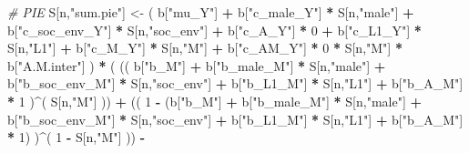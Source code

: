 \documentclass[
]{book}
\newenvironment{Shaded}{\begin{snugshade}}{\end{snugshade}}
\newcommand{\CommentTok}[1]{\textcolor[rgb]{0.56,0.35,0.01}{\textit{#1}}}
\newcommand{\DecValTok}[1]{\textcolor[rgb]{0.00,0.00,0.81}{#1}}
\newcommand{\NormalTok}[1]{#1}
\newcommand{\OtherTok}[1]{\textcolor[rgb]{0.56,0.35,0.01}{#1}}
\newcommand{\SpecialCharTok}[1]{\textcolor[rgb]{0.81,0.36,0.00}{\textbf{#1}}}
\newcommand{\StringTok}[1]{\textcolor[rgb]{0.31,0.60,0.02}{#1}}
\begin{document}
\begin{Shaded}
\begin{Highlighting}[]
    \CommentTok{\# PIE }
\NormalTok{    S[n,}\StringTok{"sum.pie"}\NormalTok{] }\OtherTok{\textless{}{-}}\NormalTok{ ( b[}\StringTok{"mu\_Y"}\NormalTok{] }\SpecialCharTok{+} 
\NormalTok{                          b[}\StringTok{"c\_male\_Y"}\NormalTok{] }\SpecialCharTok{*}\NormalTok{ S[n,}\StringTok{"male"}\NormalTok{] }\SpecialCharTok{+} 
\NormalTok{                          b[}\StringTok{"c\_soc\_env\_Y"}\NormalTok{] }\SpecialCharTok{*}\NormalTok{ S[n,}\StringTok{"soc\_env"}\NormalTok{] }\SpecialCharTok{+} 
\NormalTok{                          b[}\StringTok{"c\_A\_Y"}\NormalTok{] }\SpecialCharTok{*} \DecValTok{0} \SpecialCharTok{+} 
\NormalTok{                          b[}\StringTok{"c\_L1\_Y"}\NormalTok{] }\SpecialCharTok{*}\NormalTok{ S[n,}\StringTok{"L1"}\NormalTok{] }\SpecialCharTok{+}
\NormalTok{                          b[}\StringTok{"c\_M\_Y"}\NormalTok{] }\SpecialCharTok{*}\NormalTok{ S[n,}\StringTok{"M"}\NormalTok{] }\SpecialCharTok{+}
\NormalTok{                          b[}\StringTok{"c\_AM\_Y"}\NormalTok{] }\SpecialCharTok{*} \DecValTok{0} \SpecialCharTok{*}\NormalTok{ S[n,}\StringTok{"M"}\NormalTok{] }\SpecialCharTok{*}\NormalTok{ b[}\StringTok{"A.M.inter"}\NormalTok{] ) }\SpecialCharTok{*}
\NormalTok{      ( (( b[}\StringTok{"b\_M"}\NormalTok{] }\SpecialCharTok{+} 
\NormalTok{             b[}\StringTok{"b\_male\_M"}\NormalTok{] }\SpecialCharTok{*}\NormalTok{ S[n,}\StringTok{"male"}\NormalTok{] }\SpecialCharTok{+} 
\NormalTok{             b[}\StringTok{"b\_soc\_env\_M"}\NormalTok{] }\SpecialCharTok{*}\NormalTok{ S[n,}\StringTok{"soc\_env"}\NormalTok{] }\SpecialCharTok{+} 
\NormalTok{             b[}\StringTok{"b\_L1\_M"}\NormalTok{] }\SpecialCharTok{*}\NormalTok{ S[n,}\StringTok{"L1"}\NormalTok{] }\SpecialCharTok{+}
\NormalTok{             b[}\StringTok{"b\_A\_M"}\NormalTok{] }\SpecialCharTok{*} \DecValTok{1}\NormalTok{ )}\SpecialCharTok{\^{}}\NormalTok{( S[n,}\StringTok{"M"}\NormalTok{] )) }\SpecialCharTok{+}
\NormalTok{          (( }\DecValTok{1} \SpecialCharTok{{-}}\NormalTok{ (b[}\StringTok{"b\_M"}\NormalTok{] }\SpecialCharTok{+} 
\NormalTok{                    b[}\StringTok{"b\_male\_M"}\NormalTok{] }\SpecialCharTok{*}\NormalTok{ S[n,}\StringTok{"male"}\NormalTok{] }\SpecialCharTok{+} 
\NormalTok{                    b[}\StringTok{"b\_soc\_env\_M"}\NormalTok{] }\SpecialCharTok{*}\NormalTok{ S[n,}\StringTok{"soc\_env"}\NormalTok{] }\SpecialCharTok{+} 
\NormalTok{                    b[}\StringTok{"b\_L1\_M"}\NormalTok{] }\SpecialCharTok{*}\NormalTok{ S[n,}\StringTok{"L1"}\NormalTok{] }\SpecialCharTok{+}
\NormalTok{                    b[}\StringTok{"b\_A\_M"}\NormalTok{] }\SpecialCharTok{*} \DecValTok{1}\NormalTok{) )}\SpecialCharTok{\^{}}\NormalTok{( }\DecValTok{1} \SpecialCharTok{{-}}\NormalTok{ S[n,}\StringTok{"M"}\NormalTok{] )) }\SpecialCharTok{{-}}

\end{Highlighting}
\end{Shaded}
\end{document}
